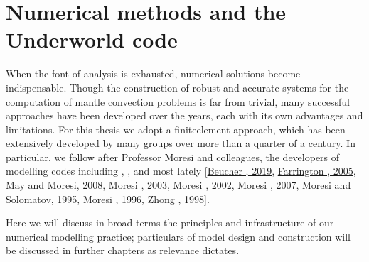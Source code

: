 \documentclass[letterpaper,10pt,english]{jupyterBook}
\begin{document}
\section{Numerical methods and the Underworld code}
\label{\detokenize{content/chapter_02_methods/section2:numerical-methods-and-the-underworld-code}}\label{\detokenize{content/chapter_02_methods/section2::doc}}
\sphinxAtStartPar
When the font of analysis is exhausted, numerical solutions become indispensable. Though the construction of robust and accurate systems for the computation of mantle convection problems is far from trivial, many successful approaches have been developed over the years, each with its own advantages and limitations. For this thesis we adopt a finite\sphinxhyphen{}element approach, which has been extensively developed by many groups over more than a quarter of a century. In particular, we follow after Professor Moresi and colleagues, the developers of modelling codes including , , and most lately  {[}\hyperlink{cite.references:id670}{Beucher , 2019}, \hyperlink{cite.references:id669}{Farrington , 2005}, \hyperlink{cite.references:id671}{May and Moresi, 2008}, \hyperlink{cite.references:id145}{Moresi , 2003}, \hyperlink{cite.references:id381}{Moresi , 2002}, \hyperlink{cite.references:id382}{Moresi , 2007}, \hyperlink{cite.references:id384}{Moresi and Solomatov, 1995}, \hyperlink{cite.references:id153}{Moresi , 1996}, \hyperlink{cite.references:id380}{Zhong , 1998}{]}.

\sphinxAtStartPar
Here we will discuss in broad terms the principles and infrastructure of our numerical modelling practice; particulars of model design and construction will be discussed in further chapters as relevance dictates.
\end{document}
